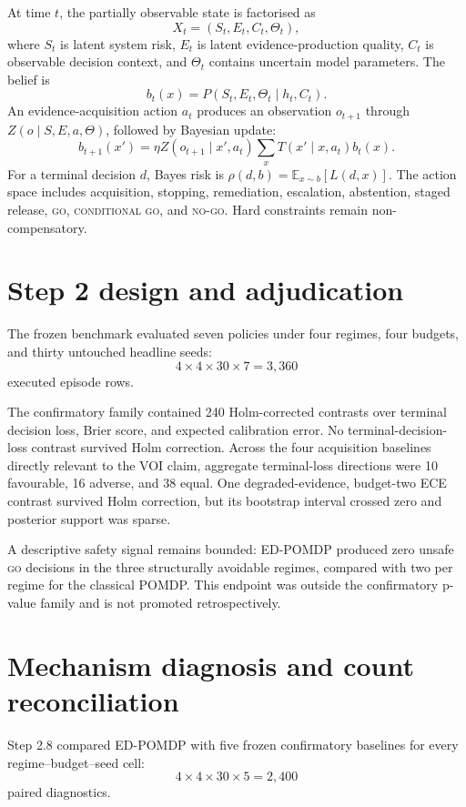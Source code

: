 \documentclass[11pt,a4paper]{article}
\newcommand{\go}{\textsc{go}}
\newcommand{\cgo}{\textsc{conditional go}}
\newcommand{\nogo}{\textsc{no-go}}
\begin{document}
At time $t$, the partially observable state is factorised as
\[
X_t=(S_t,E_t,C_t,\Theta_t),
\]
where $S_t$ is latent system risk, $E_t$ is latent evidence-production quality, $C_t$ is observable decision context, and $\Theta_t$ contains uncertain model parameters. The belief is
\[
b_t(x)=P(S_t,E_t,\Theta_t\mid h_t,C_t).
\]
An evidence-acquisition action $a_t$ produces an observation $o_{t+1}$ through $Z(o\mid S,E,a,\Theta)$, followed by Bayesian update:
\[
b_{t+1}(x')=\eta Z(o_{t+1}\mid x',a_t)\sum_xT(x'\mid x,a_t)b_t(x).
\]
For a terminal decision $d$, Bayes risk is $\rho(d,b)=\mathbb{E}_{x\sim b}[L(d,x)]$. The action space includes acquisition, stopping, remediation, escalation, abstention, staged release, \go{}, \cgo{}, and \nogo{}. Hard constraints remain non-compensatory.

\section{Step 2 design and adjudication}

The frozen benchmark evaluated seven policies under four regimes, four budgets, and thirty untouched headline seeds:
\[
4\times4\times30\times7=3{,}360
\]
executed episode rows.

The confirmatory family contained 240 Holm-corrected contrasts over terminal decision loss, Brier score, and expected calibration error. No terminal-decision-loss contrast survived Holm correction. Across the four acquisition baselines directly relevant to the VOI claim, aggregate terminal-loss directions were 10 favourable, 16 adverse, and 38 equal. One degraded-evidence, budget-two ECE contrast survived Holm correction, but its bootstrap interval crossed zero and posterior support was sparse.

A descriptive safety signal remains bounded: ED-POMDP produced zero unsafe \go{} decisions in the three structurally avoidable regimes, compared with two per regime for the classical POMDP. This endpoint was outside the confirmatory p-value family and is not promoted retrospectively.

\section{Mechanism diagnosis and count reconciliation}

Step 2.8 compared ED-POMDP with five frozen confirmatory baselines for every regime--budget--seed cell:
\[
4\times4\times30\times5=2{,}400
\]
paired diagnostics.
\end{document}
